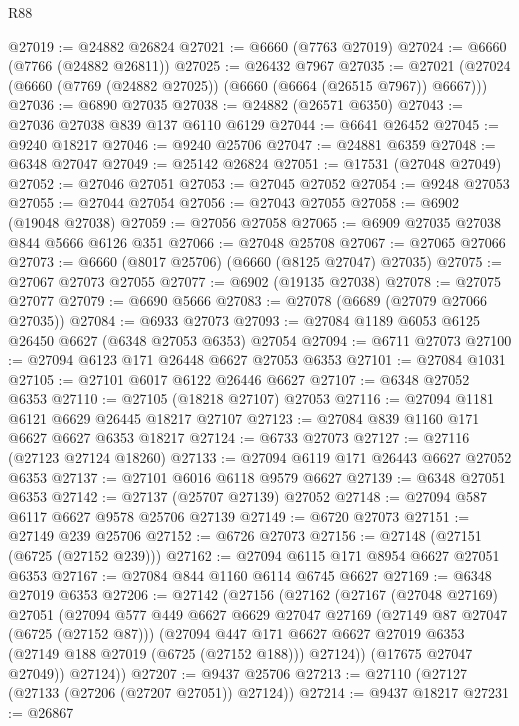 \begin{lexlean}{R88}
\begin{coremodule}
@27019 := @24882 @26824
@27021 := @6660 (@7763 @27019)
@27024 := @6660 (@7766 (@24882 @26811))
@27025 := @26432 @7967
@27035 := @27021 (@27024 (@6660 (@7769 (@24882 @27025)) (@6660 (@6664 (@26515 @7967)) @6667)))
@27036 := @6890 @27035
@27038 := @24882 (@26571 @6350)
@27043 := @27036 @27038 @839 @137 @6110 @6129
@27044 := @6641 @26452
@27045 := @9240 @18217
@27046 := @9240 @25706
@27047 := @24881 @6359
@27048 := @6348 @27047
@27049 := @25142 @26824
@27051 := @17531 (@27048 @27049)
@27052 := @27046 @27051
@27053 := @27045 @27052
@27054 := @9248 @27053
@27055 := @27044 @27054
@27056 := @27043 @27055
@27058 := @6902 (@19048 @27038)
@27059 := @27056 @27058
@27065 := @6909 @27035 @27038 @844 @5666 @6126 @351
@27066 := @27048 @25708
@27067 := @27065 @27066
@27073 := @6660 (@8017 @25706) (@6660 (@8125 @27047) @27035)
@27075 := @27067 @27073 @27055
@27077 := @6902 (@19135 @27038)
@27078 := @27075 @27077
@27079 := @6690 @5666
@27083 := @27078 (@6689 (@27079 @27066 @27035))
@27084 := @6933 @27073
@27093 := @27084 @1189 @6053 @6125 @26450 @6627 (@6348 @27053 @6353) @27054
@27094 := @6711 @27073
@27100 := @27094 @6123 @171 @26448 @6627 @27053 @6353
@27101 := @27084 @1031
@27105 := @27101 @6017 @6122 @26446 @6627
@27107 := @6348 @27052 @6353
@27110 := @27105 (@18218 @27107) @27053
@27116 := @27094 @1181 @6121 @6629 @26445 @18217 @27107
@27123 := @27084 @839 @1160 @171 @6627 @6627 @6353 @18217
@27124 := @6733 @27073
@27127 := @27116 (@27123 @27124 @18260)
@27133 := @27094 @6119 @171 @26443 @6627 @27052 @6353
@27137 := @27101 @6016 @6118 @9579 @6627
@27139 := @6348 @27051 @6353
@27142 := @27137 (@25707 @27139) @27052
@27148 := @27094 @587 @6117 @6627 @9578 @25706 @27139
@27149 := @6720 @27073
@27151 := @27149 @239 @25706
@27152 := @6726 @27073
@27156 := @27148 (@27151 (@6725 (@27152 @239)))
@27162 := @27094 @6115 @171 @8954 @6627 @27051 @6353
@27167 := @27084 @844 @1160 @6114 @6745 @6627
@27169 := @6348 @27019 @6353
@27206 := @27142
    (@27156
      (@27162
        (@27167
          (@27048 @27169)
          @27051
          (@27094
            @577
            @449
            @6627
            @6629
            @27047
            @27169
            (@27149 @87 @27047 (@6725 (@27152 @87)))
            (@27094
              @447
              @171
              @6627
              @6627
              @27019
              @6353
              (@27149 @188 @27019 (@6725 (@27152 @188)))
              @27124))
          (@17675 @27047 @27049))
        @27124))
@27207 := @9437 @25706
@27213 := @27110 (@27127 (@27133 (@27206 (@27207 @27051)) @27124))
@27214 := @9437 @18217
@27231 := @26867

\end{coremodule}
\end{lexlean}
